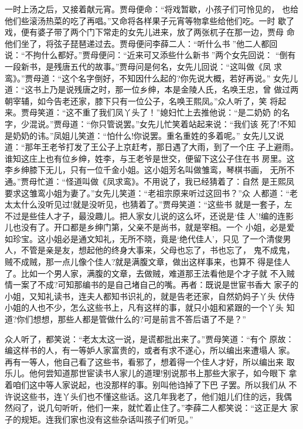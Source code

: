 一时上汤之后，又接着献元宵。贾母便命：“将戏暂歇，小孩子们可怜见的，
也给他们些滚汤热菜的吃了再唱。”又命将各样果子元宵等物拿些给他们吃。一时
歇了戏，便有婆子带了两个门下常走的女先儿进来，放了两张杌子在那一边，贾母
命他们坐了，将弦子琵琶递过去。贾母便问李薛二人：“听什么书”他二人都回
说：“不拘什么都好。”贾母便问：“近来可又添些什么新书”两个女先回说：
“倒有一段新书，是残唐五代的故事。”贾母问是何名，女先儿回说：“这叫做《凤
求鸾》。”贾母道：“这个名字倒好，不知因什么起的?你先说大概，若好再说。”
女先儿道：“这书上乃是说残唐之时，那一位乡绅，本是金陵人氏，名唤王忠，曾
做过两朝宰辅，如今告老还家，膝下只有一位公子，名唤王熙凤。”众人听了，笑
将起来。贾母笑道：“这不重了我们凤丫头了！”媳妇忙上去推他说：“是二奶奶
的名字，少混说。”贾母道：“你只管说罢。”女先儿忙笑着站起来说：“我们该
死了!不知是奶奶的讳。”凤姐儿笑道：“怕什么!你说罢。重名重姓的多着呢。”
女先儿又说道：“那年王老爷打发了王公子上京赶考，那日遇了大雨，到了一个庄
子上避雨。谁知这庄上也有位乡绅，姓李，与王老爷是世交，便留下这公子住在书
房里。这李乡绅膝下无儿，只有一位千金小姐。这小姐芳名叫做雏鸾，琴棋书画，
无所不通。”贾母忙道：“怪道叫做《凤求鸾》。不用说了，我已经猜着了：自然
是王熙凤要求这雏鸾小姐为妻了。”女先儿笑道：“老祖宗原来听过这回书？”众
人都道：“老太太什么没听见过!就是没听见，也猜着了。”贾母笑道：“这些书
就是一套子，左不过是些佳人才子，最没趣儿。把人家女儿说的这么坏，还说是‘佳
人’!编的连影儿也没有了。开口都是乡绅门第，父亲不是尚书，就是宰相。一个
小姐，必是爱如珍宝。这小姐必是通文知礼，无所不晓，竟是‘绝代佳人’，只见
了一个清俊男人，不管是亲是友，想起他的终身大事来，父母也忘了，书也忘了，
鬼不成鬼，贼不成贼，那一点儿像个佳人?就是满腹文章，做出这样事来，也算不
得是佳人了。比如一个男人家，满腹的文章，去做贼，难道那王法看他是个才子就
不入贼情一案了不成?可知那编书的是自己堵自己的嘴。再者：既说是世宦书香大
家子的小姐，又知礼读书，连夫人都知书识礼的，就是告老还家，自然奶妈子丫头
伏侍小姐的人也不少，怎么这些书上，凡有这样的事，就只小姐和紧跟的一个丫头
知道?你们想想，那些人都是管做什么的?可是前言不答后语了不是？”

众人听了，都笑说：“老太太这一说，是谎都批出来了。”贾母笑道：“有个
原故：编这样书的人，有一等妒人家富贵的，或者有求不遂心，所以编出来遭塌人
家。再有一等人，他自己看了这些书，看邪了，想着得一个佳人才好，所以编出来
取乐儿。他何尝知道那世宦读书人家儿的道理!别说那书上那些大家子，如今眼下
拿着咱们这中等人家说起，也没那样的事。别叫他诌掉了下巴子罢。所以我们从
不许说这些书，连丫头们也不懂这些话。这几年我老了，他们姐儿们住的远，我偶
然闷了，说几句听听，他们一来，就忙着止住了。”李薛二人都笑说：“这正是大
家子的规矩。连我们家也没有这些杂话叫孩子们听见。”

